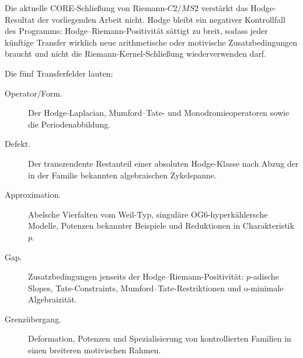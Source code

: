 \documentclass[aps,prd,twocolumn,superscriptaddress,nofootinbib]{revtex4-2}
\theoremstyle{definition}
\theoremstyle{remark}
\begin{document}
Die aktuelle CORE-Schließung von Riemann-$C2/MS2$ verstärkt das
Hodge-Resultat der vorliegenden Arbeit nicht.  Hodge bleibt ein negativer
Kontrollfall des Programms: Hodge--Riemann-Positivität sättigt zu breit,
sodass jeder künftige Transfer wirklich neue arithmetische oder motivische
Zusatzbedingungen braucht und nicht die Riemann-Kernel-Schließung
wiederverwenden darf.

Die fünf Transferfelder lauten:
\begin{description}
  \item[Operator/Form.] Der Hodge-Laplacian, Mumford--Tate- und
  Monodromieoperatoren sowie die Periodenabbildung.
  \item[Defekt.] Der transzendente Restanteil einer absoluten Hodge-Klasse
  nach Abzug der in der Familie bekannten algebraischen Zykelspanne.
  \item[Approximation.] Abelsche Vierfalten vom Weil-Typ, singuläre
  OG6-hyperkählersche Modelle, Potenzen bekannter Beispiele und
  Reduktionen in Charakteristik $p$.
  \item[Gap.] Zusatzbedingungen jenseits der Hodge--Riemann-Positivität:
  $p$-adische Slopes, Tate-Constraints, Mumford--Tate-Restriktionen und
  o-minimale Algebraizität.
  \item[Grenzübergang.] Deformation, Potenzen und Spezialisierung von
  kontrollierten Familien in einen breiteren motivischen Rahmen.
\end{description}
\end{document}
